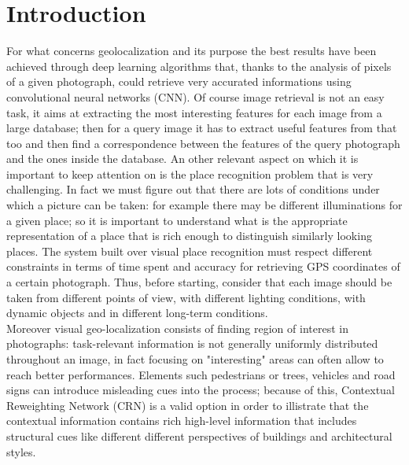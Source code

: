 \documentclass[10pt,twocolumn,letterpaper]{article}
\begin{document}
\section{Introduction}
	For what concerns geolocalization and its purpose the best results have been achieved through
	deep learning algorithms that, thanks to the analysis of pixels of a given photograph, could retrieve 
	very accurated informations using convolutional neural networks (CNN). Of course image retrieval
	is not an easy task, it aims at extracting the most interesting features for each image from a large database; then for a query image
	it has to extract useful features from that too and then  find a correspondence between the features
	of the query photograph and the ones inside the database. 
	\newline An other relevant aspect on which it is important to keep attention on is the place recognition problem that
	is very challenging. In fact we must figure out that there are lots of conditions under which a picture can be taken:
	for example there may be different illuminations for a given place; so it is important to understand what is the appropriate 
	representation of a place that is rich enough to distinguish similarly looking places. The system built over
	visual place recognition must respect different constraints in terms of time spent and accuracy for retrieving GPS coordinates
	of a certain photograph. Thus, before starting, consider that each image should be taken
	from different points of view, with different lighting conditions, with dynamic objects and in different long-term conditions.\\
	Moreover visual geo-localization consists of finding region of interest in photographs: task-relevant
	information is not generally uniformly distributed throughout an image, in fact focusing on "interesting" areas
	can often allow to reach better performances. Elements such pedestrians or trees, vehicles and road signs can introduce misleading cues 
	into the process; because of this, Contextual Reweighting Network (CRN) \cite{CRN} is a valid option in order to 
	illistrate that the contextual information contains rich high-level information that includes structural cues
	like different different perspectives of buildings and architectural styles.
\end{document}
